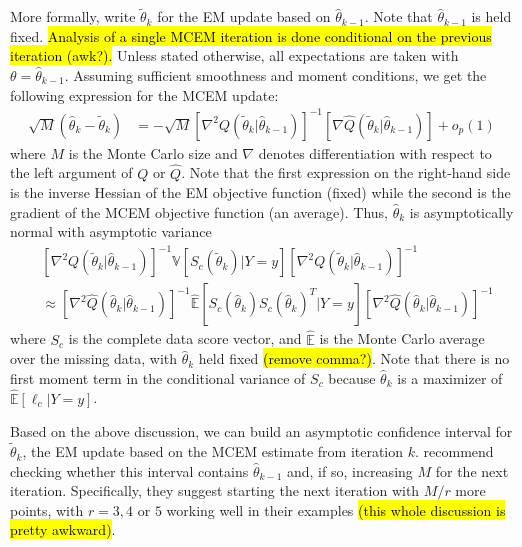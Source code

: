 \documentclass[11pt, oneside]{article}   	%
\newcommand{\bV}{\mathbb{V}}
\newcommand{\bE}{\mathbb{E}}
\newcommand{\hq}{\hat{Q}}
\begin{document}
More formally, write $\tilde{\theta}_k$ for the EM update based on $\hat{\theta}_{k-1}$. Note that $\hat{\theta}_{k-1}$ is held fixed. \hl{Analysis of a single MCEM iteration is done conditional on the previous iteration (awk?).} Unless stated otherwise, all expectations are taken with $\theta = \hat{\theta}_{k-1}$. Assuming sufficient smoothness and moment conditions, we get the following expression for the MCEM update:
%
\begin{align}
    \sqrt{M}(\hat{\theta}_k - \tilde{\theta}_k) &= - \sqrt{M} \left[ \nabla^2 Q(\tilde{\theta}_k|\hat{\theta}_{k-1})\right]^{-1} \left[\nabla \hq(\tilde{\theta}_k|\hat{\theta}_{k-1}) \right] + o_p(1) \label{eq:th_as_dist}
\end{align}
%
where $M$ is the Monte Carlo size and $\nabla$ denotes differentiation with respect to the left argument of $Q$ or $\hat{Q}$. Note that the first expression on the right-hand side is the inverse Hessian of the EM objective function (fixed) while the second is the gradient of the MCEM objective function (an average). Thus, $\hat{\theta}_k$ is asymptotically normal with asymptotic variance
%
\begin{align}
    &\left[ \nabla^2 Q(\tilde{\theta}_k|\hat{\theta}_{k-1})\right]^{-1} \bV \left[ S_c (\tilde{\theta}_k) | Y=y \right] \left[ \nabla^2 Q(\tilde{\theta}_k|\hat{\theta}_{k-1})\right]^{-1}\\
    &\approx \left[ \nabla^2 \hat{Q}(\hat{\theta}_k|\hat{\theta}_{k-1})\right]^{-1} \hat{\bE} \left[ S_c(\hat{\theta}_k) S_c(\hat{\theta}_k)^T | Y=y \right] \left[ \nabla^2 \hat{Q}(\hat{\theta}_k|\hat{\theta}_{k-1})\right]^{-1} 
\end{align}
%
where $S_c$ is the complete data score vector, and $\hat{\bE}$ is the Monte Carlo average over the missing data, with $\hat{\theta}_k$ held fixed \hl{(remove comma?)}. Note that there is no first moment term in the conditional variance of $S_c$ because $\hat{\theta}_k$ is a maximizer of $\hat{\bE} [\ell_c |Y=y]$.

Based on the above discussion, we can build an asymptotic confidence interval for $\tilde{\theta}_k$, the EM update based on the MCEM estimate from iteration $k$. \citeauthor{Boo99} recommend checking whether this interval contains $\hat{\theta}_{k-1}$ and, if so, increasing $M$ for the next iteration. Specifically, they suggest starting the next iteration with $M/r$ more points, with $r = 3,4$ or $5$ working well in their examples \hl{(this whole discussion is pretty awkward)}.
\end{document}
